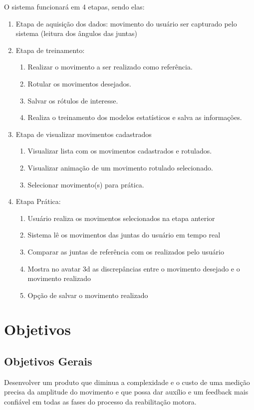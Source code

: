   O sistema funcionará em 4 etapas, sendo elas:
  \begin{enumerate}
  \item Etapa de aquisição dos dados: movimento do usuário ser capturado pelo sistema (leitura dos ângulos das juntas)
  \item Etapa de treinamento: 
    \begin{enumerate}
    \item Realizar o movimento a ser realizado como referência.
    \item Rotular os movimentos desejados.
    \item Salvar os rótulos de interesse.
    \item Realiza o treinamento dos modelos estatísticos e salva as informações.
    \end{enumerate}
  \item Etapa de visualizar movimentos cadastrados
    \begin{enumerate}
    \item Visualizar lista com os movimentos cadastrados e rotulados.
    \item Visualizar animação de um movimento rotulado selecionado.
    \item Selecionar movimento(s) para prática.
  \end{enumerate}  
  \item Etapa Prática:
    \begin{enumerate}
    \item Usuário realiza os movimentos selecionados na etapa anterior
    \item Sistema lê os movimentos das juntas do usuário em tempo real
    \item Comparar as juntas de referência com os realizados pelo usuário
    \item Mostra no avatar 3d as discrepâncias entre o movimento desejado e o movimento realizado
    \item Opção de salvar o movimento realizado
    \end{enumerate}
  \end{enumerate}                   
\section{Objetivos}                                                             
\label{Sec:Objetivos}
\subsection{Objetivos Gerais}                           
\label{Sub:ObjetivosGerais}
  Desenvolver um produto que diminua a complexidade e o custo de uma medição 
precisa da amplitude do movimento e que possa dar auxílio e um feedback mais 
confiável em todas as fases do processo da reabilitação motora.

